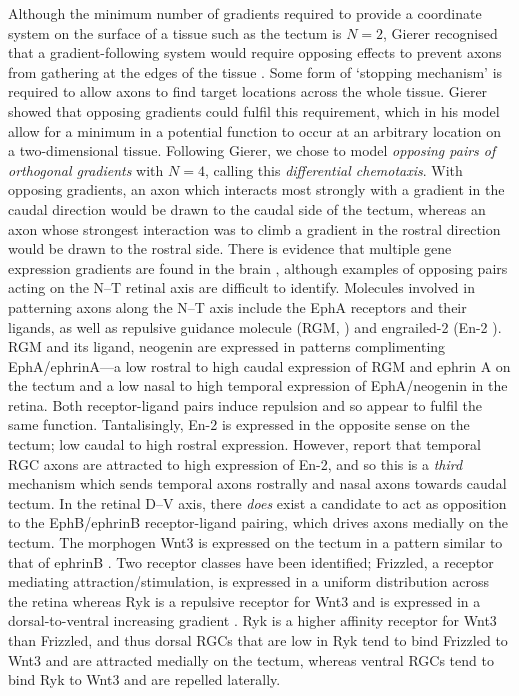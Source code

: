 \documentclass[9pt,lineno,draft]{elife}
\begin{document}
Although the minimum number of gradients required to provide a coordinate system on the surface of a tissue such as the tectum is $N=2$, Gierer recognised that a gradient-following system would require opposing effects to prevent axons from gathering at the edges of the tissue \citep{gierer_model_1983}.
Some form of `stopping mechanism' is required to allow axons to find target locations across the whole tissue. Gierer showed that opposing gradients could fulfil this requirement, which in his model allow for a minimum in a potential function to occur at an arbitrary location on a two-dimensional tissue.
Following Gierer, we chose to model \emph{opposing pairs of orthogonal gradients} with $N=4$, calling this \emph{differential chemotaxis}.
With opposing gradients, an axon which interacts most strongly with a gradient in the caudal direction would be drawn to the caudal side of the tectum, whereas an axon whose strongest interaction was to climb a gradient in the rostral direction would be drawn to the rostral side.
There is evidence that multiple gene expression gradients are found in the brain \citep{cang_developmental_2013}, although examples of opposing pairs acting on the N--T retinal axis are difficult to identify.
Molecules involved in patterning axons along the N--T axis include the EphA receptors and their ligands, as well as repulsive guidance molecule (RGM, \citet{monnier_rgm_2002}) and engrailed-2 (En-2 \citet{brunet_transcription_2005}).
RGM and its ligand, neogenin are expressed in patterns complimenting EphA/ephrinA---a low rostral to high caudal expression of RGM and ephrin A on the tectum and a low nasal to high temporal expression of EphA/neogenin in the retina. Both receptor-ligand pairs induce repulsion and so appear to fulfil the same function.
Tantalisingly, En-2 is expressed in the opposite sense on the tectum; low caudal to high rostral expression. However, \citet{brunet_transcription_2005} report that temporal RGC axons are attracted to high expression of En-2, and so this is a \emph{third} mechanism which sends temporal axons rostrally and nasal axons towards caudal tectum.
In the retinal D--V axis, there \emph{does} exist a candidate to act as opposition to the EphB/ephrinB receptor-ligand pairing, which drives axons medially on the tectum.
The morphogen Wnt3 is expressed on the tectum in a pattern similar to that of ephrinB \citep{schmitt_wntryk_2006}.
Two receptor classes have been identified; Frizzled, a receptor mediating attraction/stimulation, is expressed in a uniform distribution across the retina whereas Ryk is a repulsive receptor for Wnt3 and is expressed in a dorsal-to-ventral increasing gradient \citep{schmitt_wntryk_2006}. Ryk is a higher affinity receptor for Wnt3 than Frizzled, and thus dorsal RGCs that are low in Ryk tend to bind Frizzled to Wnt3 and are attracted medially on the tectum, whereas ventral RGCs tend to bind Ryk to Wnt3 and are repelled laterally.
\end{document}
